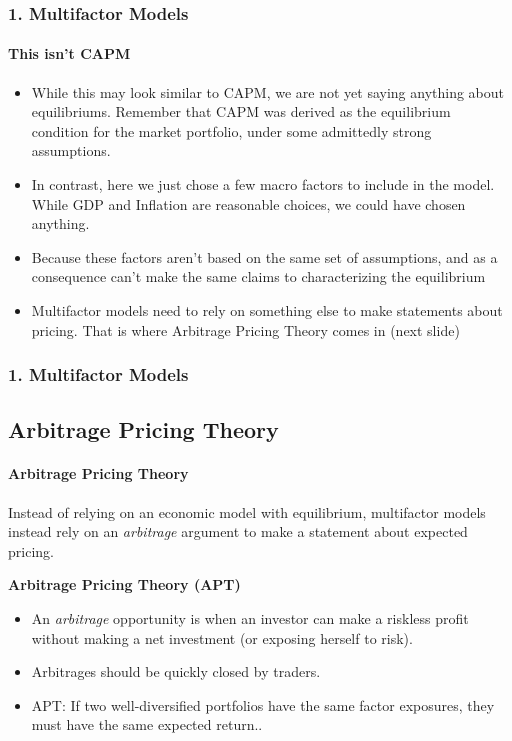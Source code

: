 \documentclass{beamer}
\begin{document}
\begin{frame}[t]
    \frametitle{1. Multifactor Models}
    \framesubtitle{This isn't CAPM}

    \begin{itemize}
    \item While this may look similar to CAPM, we are not yet saying anything about equilibriums. Remember that CAPM was derived as the equilibrium condition for the market portfolio, under some admittedly strong assumptions.
    \item In contrast, here we just chose a few macro factors to include in the model.  While GDP and Inflation are reasonable choices, we could have chosen anything.   
    \item Because these factors aren't based on the same set of 
    assumptions, and as a consequence can't make the same claims to characterizing the equilibrium
    \item Multifactor models need to rely on something else to make statements about pricing.   That is where Arbitrage Pricing Theory comes in (next slide)
    \end{itemize}

\end{frame}

\begin{frame}[t]
    \frametitle{1. Multifactor Models}
    \subsection{Arbitrage Pricing Theory}
    \framesubtitle{Arbitrage Pricing Theory}

    Instead of relying on an economic model with equilibrium, multifactor models instead rely on an \textit{arbitrage} argument to make a statement about expected pricing.   
    \vspace{1em}
    
    \textbf{Arbitrage Pricing Theory (APT)}
    \begin{itemize}
    \item An \textit{arbitrage} opportunity is when an investor can make a riskless profit without making a net investment (or exposing herself to risk).   
    \item Arbitrages should be quickly closed by traders.  
    \item APT: If two well-diversified portfolios have the same factor exposures, they must have the same expected return.. 
    \end{itemize}

\end{frame}
\end{document}
